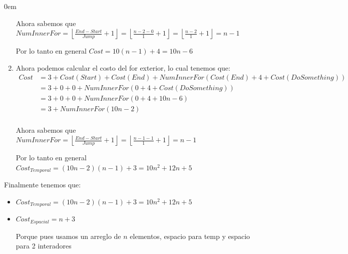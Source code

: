 \documentclass[12pt, fleqn]{article}                            %
\newenvironment{SmallIndentation}[1][0.75em]                    %
        {\begin{adjustwidth}{#1}{}\begin{footnotesize}}             %
        {\end{footnotesize}\end{adjustwidth}}                       %
\theoremstyle{break}                                            %
\newcommand{\Floor}[1]{\left \lfloor #1 \right \rfloor}         %
\begin{document}
\begin{SmallIndentation}[0em]
\begin{enumerate}
                Ahora sabemos que 
                $NumInnerFor 
                    = \Floor{\frac{End - Start}{Jump} + 1}
                    = \Floor{\frac{n - 2 - 0}{1} + 1}
                    = \Floor{\frac{n - 2}{1} + 1}
                    = n-1$

                Por lo tanto en general $Cost = 10(n-1)+4 = 10n - 6$

            \item
                Ahora podemos calcular el costo del for exterior, lo cual tenemos que:
                \begin{align*}
                    Cost 
                        &= 3 + Cost(Start) + Cost(End) + NumInnerFor(Cost(End) + 4 + Cost(DoSomething))     \\
                        &= 3 + 0 + 0 + NumInnerFor(0 + 4 + Cost(DoSomething))                               \\
                        &= 3 + 0 + 0 + NumInnerFor(0 + 4 + 10n - 6)                                         \\
                        &= 3 + NumInnerFor(10n - 2)                                                         \\
                \end{align*}

                Ahora sabemos que 
                $NumInnerFor 
                    = \Floor{\frac{End - Start}{Jump} + 1}
                    = \Floor{\frac{n-1 - 1}{1} + 1}
                    = n-1$

                Por lo tanto en general $Cost_{Temporal} = (10n - 2)(n-1) + 3 = 10n^2 + 12n + 5$
        \end{enumerate}

        Finalmente tenemos que:
        \begin{itemize}
            \item $Cost_{Temporal} = (10n - 2)(n-1) + 3 = 10n^2 + 12n + 5$
            \item $Cost_{Espacial} = n + 3$

                Porque pues usamos un arreglo de $n$ elementos, espacio para temp y espacio para 2
                interadores
        \end{itemize}
            
    \end{SmallIndentation}



    \clearpage
\end{document}
